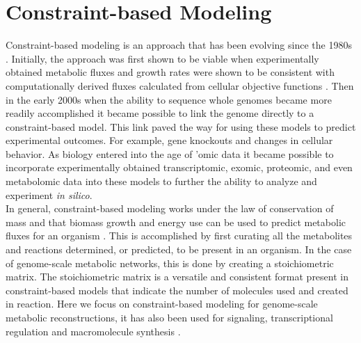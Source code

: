 %
%
%
%
%
%

\section{Constraint-based Modeling}

\indent\indent Constraint-based modeling is an approach that has been evolving since the 1980s \citep{fell_fat_1986,majewski_simple_1990}. Initially, the approach was first shown to be viable when experimentally obtained metabolic fluxes and growth rates were shown to be consistent with computationally derived fluxes calculated from cellular objective functions \citep{savinell_optimal_1992,schuster_elementary_1994}.  Then in the early 2000s when the ability to sequence whole genomes became more readily accomplished it became possible to link the genome directly to a constraint-based model. This link paved the way for using these models to predict experimental outcomes. For example, gene knockouts and changes in cellular behavior. As biology entered into the age of 'omic data it became possible to incorporate experimentally obtained transcriptomic, exomic, proteomic, and even metabolomic data into these models to further the ability to analyze and experiment \textit{in silico}.\\
%
%
%
\indent In general, constraint-based modeling works under the law of conservation of mass and that biomass growth and energy use can be used to predict metabolic fluxes for an organism \citep{schilling_theory_2000,schuster_elementary_1994}. This is accomplished by first curating all the metabolites and reactions determined, or predicted, to be present in an organism. In the case of genome-scale metabolic networks, this is done by creating a stoichiometric matrix. The stoichiometric matrix is a versatile and consistent format present in constraint-based models that indicate the number of molecules used and created in reaction. Here we focus on constraint-based modeling for genome-scale metabolic reconstructions, it has also been used for signaling, transcriptional regulation and macromolecule synthesis \citep{papin_jak-stat_2004,li_identification_2009}.\\
